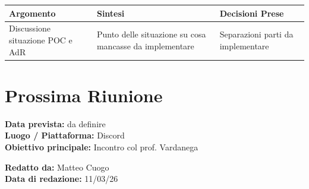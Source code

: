 \documentclass[a4paper,12pt]{article}
\begin{document}
\begin{longtable}{|p{}|p{}|p{}|}
\hline
\textbf{Argomento} & \textbf{Sintesi} & \textbf{Decisioni Prese} \\ \hline
Discussione situazione POC e AdR& Punto delle situazione su cosa mancasse da implementare & Separazioni parti da implementare \\ \hline
\end{longtable}

\section*{ Prossima Riunione}
\textbf{Data prevista:} da definire \\
\textbf{Luogo / Piattaforma:} Discord \\
\textbf{Obiettivo principale:} Incontro col prof. Vardanega

\textbf{Redatto da:} Matteo Cuogo \\
\textbf{Data di redazione:} 11/03/26
\end{document}
